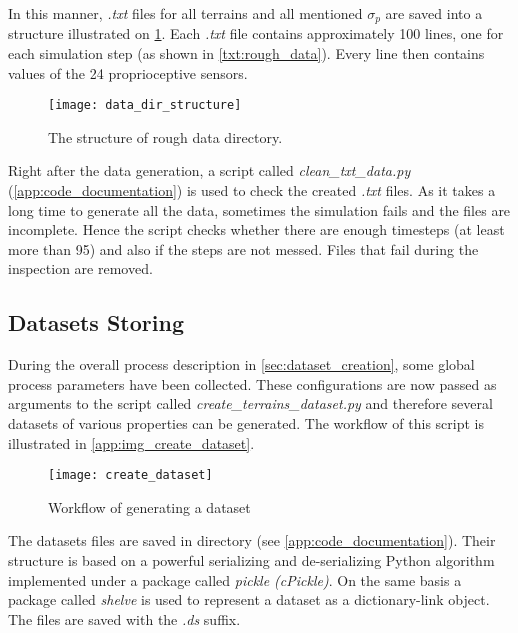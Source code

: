 In this manner, \textit{.txt} files for all terrains and all mentioned $ \sigma_p $ are saved into a structure illustrated on \cref{img:data_dir_structure}. Each \textit{.txt} file contains approximately 100 lines, one for each simulation step (as shown in \cref{txt:rough_data}). Every line then contains values of the 24 proprioceptive sensors.

\begin{figure}[H]
  \centering
  \texttt{[image: data\_dir\_structure]}
  \caption{The structure of rough data directory.}
  \label{img:data_dir_structure}
\end{figure}

Right after the data generation, a script called \textit{clean\_txt\_data.py} (\ref{app:code_documentation}) is used to check the created \textit{.txt} files. As it takes a long time to generate all the data, sometimes the simulation fails and the files are incomplete. Hence the script checks whether there are enough timesteps (at least more than 95) and also if the steps are not messed. Files that fail during the inspection are removed.

\subsection*{Datasets Storing} \label{ssec:app:datasets_storing}
During the overall process description in \cref{sec:dataset_creation}, some global process parameters have been collected. These configurations are now passed as arguments to the script called \textit{create\_terrains\_dataset.py} and therefore several datasets of various properties can be generated. The workflow of this script is illustrated in \cref{app:img_create_dataset}.

\begin{figure}[H]
  \centering
  \texttt{[image: create\_dataset]}
  \caption{Workflow of generating a dataset}
  \label{app:img:create_dataset}
\end{figure}

The datasets files are saved in directory  (see \ref{app:code_documentation}). Their structure is based on a powerful serializing and de-serializing Python algorithm implemented under a package called \textit{pickle (cPickle)}. On the same basis a package called \textit{shelve} is used to represent a dataset as a dictionary-link object. The files are saved with the \textit{.ds} suffix.

